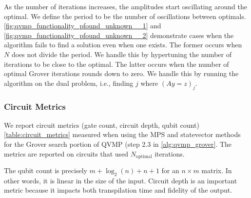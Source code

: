 \documentclass[11pt]{article}
\theoremstyle{definition}
\theoremstyle{remark}
\begin{document}
As the number of iterations increases, the amplitudes start oscillating around
the optimal.  We define the period to be the number of oscillations between
optimals.  \cref{fig:qvmp_functionality_pfound_unknown__1} and
\cref{fig:qvmp_functionality_pfound_unknown__2} demonstrate cases when the
algorithm fails to find a solution even when one exists.  The former occurs when
$N$ does not divide the period.  We handle this by hypertuning the number of
iterations to be close to the optimal.  The latter occurs when the number of
optimal Grover iterations rounds down to zero. We handle this by running
the algorithm on the dual problem, i.e., finding $j$ where $(Ay = z)_j$.

\subsubsection{Circuit Metrics} \label{sec:circuit_metrics}



We report circuit metrics (gate count, circuit depth, qubit count)
\cref{table:circuit_metrics} measured when using the MPS and statevector methods
for the Grover search portion of QVMP (step 2.3 in \cref{alg:qvmp_grover}. The
metrics are reported on circuits that used $N_{\text{optimal}}$ iterations.

The qubit count is precisely $m + \log_2(n) + n + 1$ for an $n \times m$ matrix.
In other words, it is linear in the size of the input. Circuit depth is an
important metric because it impacts both transpilation time and fidelity of the
output.
\end{document}
